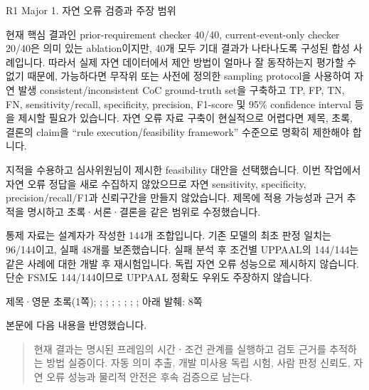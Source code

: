 




\clearpage

\begin{reviewitem}{R1 Major 1. 자연 오류 검증과 주장 범위}

\begin{reviewercomment}

현재 핵심 결과인 prior-requirement checker 40/40, current-event-only checker 20/40은 의미 있는 ablation이지만, 40개 모두 기대 결과가 나타나도록 구성된 합성 사례입니다. 따라서 실제 자연 데이터에서 제안 방법이 얼마나 잘 동작하는지 평가할 수 없기 때문에, 가능하다면 무작위 또는 사전에 정의한 sampling protocol을 사용하여 자연 발생 consistent/inconsistent CoC ground-truth set을 구축하고 TP, FP, TN, FN, sensitivity/recall, specificity, precision, F1-score 및 95\% confidence interval 등을 제시할 필요가 있습니다. 자연 오류 자료 구축이 현실적으로 어렵다면 제목, 초록, 결론의 claim을 ``rule execution/feasibility framework'' 수준으로 명확히 제한해야 합니다.

\end{reviewercomment}

\begin{authorresponse}

지적을 수용하고 심사위원님이 제시한 feasibility 대안을 선택했습니다. 이번 작업에서 자연 오류 정답을 새로 수집하지 않았으므로 자연 sensitivity, specificity, precision/recall/F1과 신뢰구간을 만들지 않았습니다. 제목에 적용 가능성과 근거 추적을 명시하고 초록·서론·결론을 같은 범위로 수정했습니다.

통제 자료는 설계자가 작성한 144개 조합입니다. 기존 모델의 최초 판정 일치는 96/144이고, 실패 48개를 보존했습니다. 실패 분석 후 조건별 UPPAAL의 144/144는 같은 사례에 대한 개발 후 재시험입니다. 독립 자연 오류 성능으로 제시하지 않습니다. 단순 FSM도 144/144이므로 UPPAAL 정확도 우위도 주장하지 않습니다.

\end{authorresponse}

\begin{manuscriptrevision}{제목·영문 초록(1쪽); ; ; ; ; ; ; ; 아래 발췌: 8쪽}

본문에 다음 내용을 반영했습니다.

\begin{quote}

현재 결과는 명시된 프레임의 시간ㆍ조건 관계를 실행하고 검토 근거를 추적하는 방법 실증이다. 자동 의미 추출, 개발 미사용 독립 시험, 사람 판정 신뢰도, 자연 오류 성능과 물리적 안전은 후속 검증으로 남는다.

\end{quote}

\end{manuscriptrevision}

\end{reviewitem}

